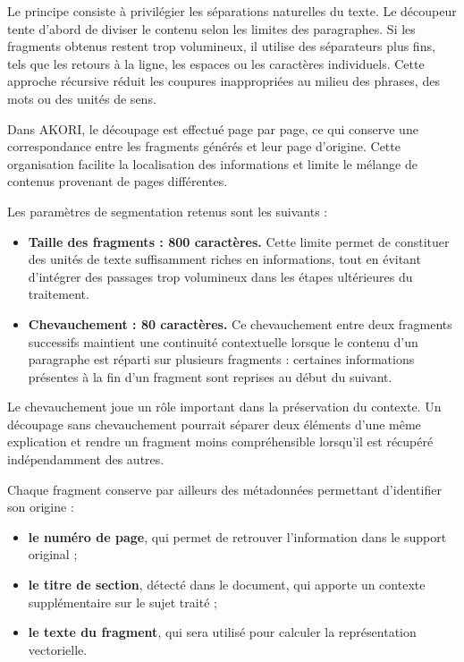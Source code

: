 \documentclass[12pt,a4paper,oneside]{report}
\begin{document}
Le principe consiste à privilégier les séparations naturelles du texte. Le découpeur tente d'abord de diviser le contenu selon les limites des paragraphes. Si les fragments obtenus restent trop volumineux, il utilise des séparateurs plus fins, tels que les retours à la ligne, les espaces ou les caractères individuels. Cette approche récursive réduit les coupures inappropriées au milieu des phrases, des mots ou des unités de sens.

Dans AKORI, le découpage est effectué page par page, ce qui conserve une correspondance entre les fragments générés et leur page d'origine. Cette organisation facilite la localisation des informations et limite le mélange de contenus provenant de pages différentes.

Les paramètres de segmentation retenus sont les suivants :
\begin{itemize}
  \item \textbf{Taille des fragments : 800 caractères.} Cette limite permet de constituer des unités de texte suffisamment riches en informations, tout en évitant d'intégrer des passages trop volumineux dans les étapes ultérieures du traitement.
  \item \textbf{Chevauchement : 80 caractères.} Ce chevauchement entre deux fragments successifs maintient une continuité contextuelle lorsque le contenu d'un paragraphe est réparti sur plusieurs fragments : certaines informations présentes à la fin d'un fragment sont reprises au début du suivant.
\end{itemize}

Le chevauchement joue un rôle important dans la préservation du contexte. Un découpage sans chevauchement pourrait séparer deux éléments d'une même explication et rendre un fragment moins compréhensible lorsqu'il est récupéré indépendamment des autres.

Chaque fragment conserve par ailleurs des métadonnées permettant d'identifier son origine :
\begin{itemize}
  \item \textbf{le numéro de page}, qui permet de retrouver l'information dans le support original ;
  \item \textbf{le titre de section}, détecté dans le document, qui apporte un contexte supplémentaire sur le sujet traité ;
  \item \textbf{le texte du fragment}, qui sera utilisé pour calculer la représentation vectorielle.
\end{itemize}
\end{document}
